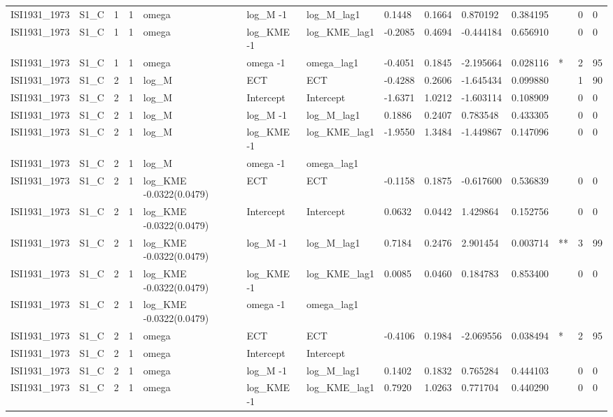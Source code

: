 \begin{tabular}{llllllllllllll}
ISI1931\_1973 & S1\_C & 1 & 1 & omega & log\_M -1 & log\_M\_lag1 & 0.1448 & 0.1664 & 0.870192 & 0.384195 &  & 0 & 0 \\
ISI1931\_1973 & S1\_C & 1 & 1 & omega & log\_KME -1 & log\_KME\_lag1 & -0.2085 & 0.4694 & -0.444184 & 0.656910 &  & 0 & 0 \\
ISI1931\_1973 & S1\_C & 1 & 1 & omega & omega -1 & omega\_lag1 & -0.4051 & 0.1845 & -2.195664 & 0.028116 & * & 2 & 95 \\
ISI1931\_1973 & S1\_C & 2 & 1 & log\_M & ECT & ECT & -0.4288 & 0.2606 & -1.645434 & 0.099880 &  & 1 & 90 \\
ISI1931\_1973 & S1\_C & 2 & 1 & log\_M & Intercept & Intercept & -1.6371 & 1.0212 & -1.603114 & 0.108909 &  & 0 & 0 \\
ISI1931\_1973 & S1\_C & 2 & 1 & log\_M & log\_M -1 & log\_M\_lag1 & 0.1886 & 0.2407 & 0.783548 & 0.433305 &  & 0 & 0 \\
ISI1931\_1973 & S1\_C & 2 & 1 & log\_M & log\_KME -1 & log\_KME\_lag1 & -1.9550 & 1.3484 & -1.449867 & 0.147096 &  & 0 & 0 \\
ISI1931\_1973 & S1\_C & 2 & 1 & log\_M & omega -1 & omega\_lag1 &  &  &  &  &  &  &  \\
ISI1931\_1973 & S1\_C & 2 & 1 & log\_KME -0.0322(0.0479) & ECT & ECT & -0.1158 & 0.1875 & -0.617600 & 0.536839 &  & 0 & 0 \\
ISI1931\_1973 & S1\_C & 2 & 1 & log\_KME -0.0322(0.0479) & Intercept & Intercept & 0.0632 & 0.0442 & 1.429864 & 0.152756 &  & 0 & 0 \\
ISI1931\_1973 & S1\_C & 2 & 1 & log\_KME -0.0322(0.0479) & log\_M -1 & log\_M\_lag1 & 0.7184 & 0.2476 & 2.901454 & 0.003714 & ** & 3 & 99 \\
ISI1931\_1973 & S1\_C & 2 & 1 & log\_KME -0.0322(0.0479) & log\_KME -1 & log\_KME\_lag1 & 0.0085 & 0.0460 & 0.184783 & 0.853400 &  & 0 & 0 \\
ISI1931\_1973 & S1\_C & 2 & 1 & log\_KME -0.0322(0.0479) & omega -1 & omega\_lag1 &  &  &  &  &  &  &  \\
ISI1931\_1973 & S1\_C & 2 & 1 & omega & ECT & ECT & -0.4106 & 0.1984 & -2.069556 & 0.038494 & * & 2 & 95 \\
ISI1931\_1973 & S1\_C & 2 & 1 & omega & Intercept & Intercept &  &  &  &  &  &  &  \\
ISI1931\_1973 & S1\_C & 2 & 1 & omega & log\_M -1 & log\_M\_lag1 & 0.1402 & 0.1832 & 0.765284 & 0.444103 &  & 0 & 0 \\
ISI1931\_1973 & S1\_C & 2 & 1 & omega & log\_KME -1 & log\_KME\_lag1 & 0.7920 & 1.0263 & 0.771704 & 0.440290 &  & 0 & 0 \\

\end{tabular}
